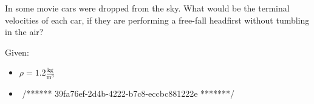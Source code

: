 
In some movie cars were dropped from the sky.
What would be the terminal velocities of each car, if they are
performing a free-fall headfirst without tumbling in the air?

\bigbreak Given:
\begin{itemize}
/*************  ✨ Codeium Command 🌟  *************/
    \item $\rho = 1.2 \frac{\text{kg}}{\text{m}^3}$
    \item $ $
/******  39fa76ef-2d4b-4222-b7c8-eccbc881222e  *******/
\end{itemize}
